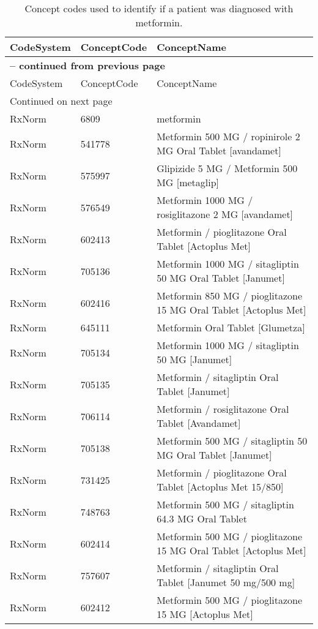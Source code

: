 \begin{longtable}{p{}p{}p{}}
\caption{Concept codes used to identify if a patient was diagnosed with metformin.} \\ 
 CodeSystem & ConceptCode & ConceptName \\ 
  \hline 
\endfirsthead 
\multicolumn{3}{p{\textwidth}}{{ \bfseries \tablename \thetable{} -- continued from previous page}} \\ 
\hline CodeSystem & ConceptCode & ConceptName \\ \hline 
\endhead 
\hline \multicolumn{3}{p{\textwidth}}{{Continued on next page}} \\ \hline 
\endfoot 
\hline 
\endlastfoot 
 \hline
RxNorm & 6809 & metformin \\ 
  RxNorm & 541778 & Metformin 500 MG / ropinirole 2 MG Oral Tablet [avandamet] \\ 
  RxNorm & 575997 & Glipizide 5 MG / Metformin 500 MG [metaglip] \\ 
  RxNorm & 576549 & Metformin 1000 MG / rosiglitazone 2 MG [avandamet] \\ 
  RxNorm & 602413 & Metformin / pioglitazone Oral Tablet [Actoplus Met] \\ 
  RxNorm & 705136 & Metformin 1000 MG / sitagliptin 50 MG Oral Tablet [Janumet] \\ 
  RxNorm & 602416 & Metformin 850 MG / pioglitazone 15 MG Oral Tablet [Actoplus Met] \\ 
  RxNorm & 645111 & Metformin Oral Tablet [Glumetza] \\ 
  RxNorm & 705134 & Metformin 1000 MG / sitagliptin 50 MG [Janumet] \\ 
  RxNorm & 705135 & Metformin / sitagliptin Oral Tablet [Janumet] \\ 
  RxNorm & 706114 & Metformin / rosiglitazone Oral Tablet [Avandamet] \\ 
  RxNorm & 705138 & Metformin 500 MG / sitagliptin 50 MG Oral Tablet [Janumet] \\ 
  RxNorm & 731425 & Metformin / pioglitazone Oral Tablet [Actoplus Met 15/850] \\ 
  RxNorm & 748763 & Metformin 500 MG / sitagliptin 64.3 MG Oral Tablet \\ 
  RxNorm & 602414 & Metformin 500 MG / pioglitazone 15 MG Oral Tablet [Actoplus Met] \\ 
  RxNorm & 757607 & Metformin / sitagliptin Oral Tablet [Janumet 50 mg/500 mg] \\ 
  RxNorm & 602412 & Metformin 500 MG / pioglitazone 15 MG [Actoplus Met] \\ 

\end{longtable}
